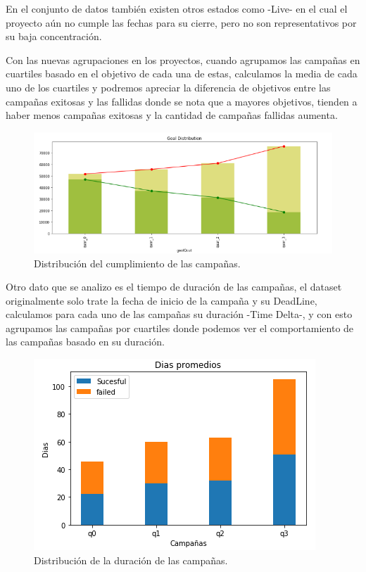 \documentclass[journal]{IEEEtran}
\begin{document}
En el conjunto de datos también existen otros estados como -Live- en el cual el proyecto aún no cumple las fechas para su cierre, pero no son representativos por su baja concentración.

Con las nuevas agrupaciones en los proyectos, cuando agrupamos las campañas en cuartiles basado en el objetivo de cada una de estas, calculamos la media de cada uno de los cuartiles y podremos apreciar la diferencia de objetivos entre las campañas exitosas y las fallidas donde se nota que a mayores objetivos, tienden a haber menos campañas exitosas y la cantidad de campañas fallidas aumenta.

\begin{figure}[H]
    \centering
    \captionsetup{justification=centering}
\includegraphics[width=\linewidth]{Images/GoalDistribution.png}
    \caption{Distribución del cumplimiento de las campañas. }
\end{figure}

Otro dato que se analizo es el tiempo de duración de las campañas, el dataset originalmente solo trate la fecha de inicio de la campaña y su DeadLine, calculamos para cada uno de las campañas su duración -Time Delta-, y con esto agrupamos las campañas por cuartiles donde podemos ver el comportamiento de las campañas basado en su duración.

\begin{figure}[H]
    \centering
    \captionsetup{justification=centering}
\includegraphics[width=\linewidth]{Images/dias.png}
    \caption{Distribución de la duración de las campañas. }
\end{figure}
\end{document}
